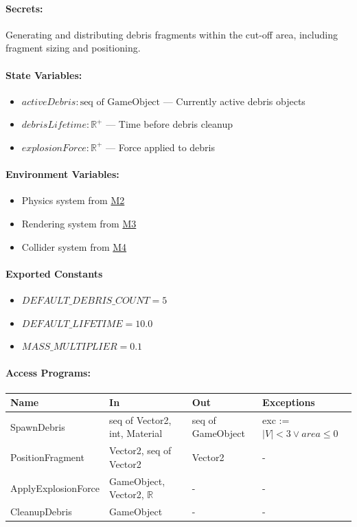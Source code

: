 \documentclass[12pt, titlepage]{article}
\begin{document}
\paragraph{Secrets:}
Generating and distributing debris fragments within the cut-off area, including fragment sizing and positioning.

\paragraph{State Variables:}
\begin{itemize}
\item $activeDebris : \text{seq of GameObject}$ --- Currently active debris objects
\item $debrisLifetime : \mathbb{R}^+$ --- Time before debris cleanup
\item $explosionForce : \mathbb{R}^+$ --- Force applied to debris
\end{itemize}

\paragraph{Environment Variables:}
\begin{itemize}
\item Physics system from \hyperref[M2]{M2}
\item Rendering system from \hyperref[M3]{M3}
\item Collider system from \hyperref[M4]{M4}
\end{itemize}

\paragraph{Exported Constants}
\begin{itemize}
\item $DEFAULT\_DEBRIS\_COUNT = 5$
\item $DEFAULT\_LIFETIME = 10.0$
\item $MASS\_MULTIPLIER = 0.1$
\end{itemize}

\paragraph{Access Programs:}

\begin{center}
\begin{tabular}{p{37mm}p{32mm}p{30mm}p{45mm}}
\toprule
\textbf{Name} & \textbf{In} & \textbf{Out} & \textbf{Exceptions} \\
\midrule
SpawnDebris & seq of Vector2, int, Material & seq of GameObject & exc := $|V| < 3 \lor area \leq 0$ \\
PositionFragment & Vector2, seq of Vector2 & Vector2 & - \\
ApplyExplosionForce & GameObject, Vector2, $\mathbb{R}$ & - & - \\
CleanupDebris & GameObject & - & - \\
\bottomrule
\end{tabular}
\end{center}
\end{document}
